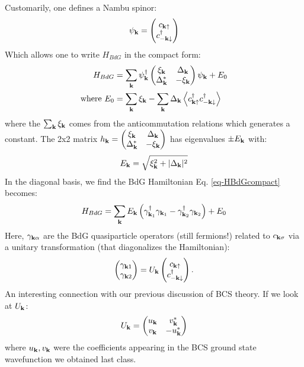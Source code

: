 Customarily, one defines a Nambu spinor:
\begin{equation}
    \psi_{\mathbf{k}} = \begin{pmatrix}c_{\mathbf{k}\uparrow} \\ c^\dagger_{-\mathbf{k}\downarrow}\end{pmatrix}
\end{equation}
Which allows one to write $H_{BdG}$ in the compact form:
\begin{equation}\label{eq-HBdGcompact}
    \begin{split}
        H_{BdG} &= \sum_{\mathbf{k}} \psi_{\mathbf{k}}^\dagger \begin{pmatrix}\xi_{\mathbf{k}} & \Delta_{\mathbf{k}} \\ \Delta_{\mathbf{k}}^* & -\xi_{\mathbf{k}}\end{pmatrix}\psi_{\mathbf{k}} + E_0
        \\ \text{where }  E_0 &= \sum_{\mathbf{k}}\xi_{\mathbf{k}} - \sum_{\mathbf{k}}\Delta_{\mathbf{k}}\left< c^\dagger_{\mathbf{k}\uparrow}c^\dagger_{-\mathbf{k}\downarrow} \right>
    \end{split}
\end{equation}
where the $\sum_{\mathbf{k}}\xi_{\mathbf{k}}$ comes from the anticommutation relations which generates a constant. The 2x2 matrix $h_{\mathbf{k}} = \begin{pmatrix}\xi_{\mathbf{k}} & \Delta_{\mathbf{k}} \\ \Delta_{\mathbf{k}}^* & -\xi_{\mathbf{k}}\end{pmatrix}$ has eigenvalues $\pm E_{\mathbf{k}}$ with:
\begin{equation}
    E_{\mathbf{k}} = \sqrt{\xi_{\mathbf{k}}^2 + \lvert \Delta_{\mathbf{k}} \rvert^2}
\end{equation}
In the diagonal basis, we find the BdG Hamiltonian Eq. \eqref{eq-HBdGcompact} becomes:
\begin{equation}\label{eq-BdGdiagonal}
    H_{BdG} = \sum_{\mathbf{k}}E_{\mathbf{k}}\left(\gamma^\dagger_{\mathbf{k}_1}\gamma_{\mathbf{k}_1} - \gamma^\dagger_{\mathbf{k}_2}\gamma_{\mathbf{k}_2}\right) + E_0
\end{equation}
Here, $\gamma_{\mathbf{k}\alpha}$ are the BdG quasiparticle operators (still fermions!) related to $c_{\mathbf{k}\sigma}$ via a unitary transformation (that diagonalizes the Hamiltonian):
\begin{align*}
    \begin{pmatrix}\gamma_{\mathbf{k}1} \\ \gamma_{\mathbf{k}2}\end{pmatrix} = U_{\mathbf{k}}\begin{pmatrix}c_{\mathbf{k}\uparrow} \\ c^\dagger_{-\mathbf{k}\downarrow}\end{pmatrix}.
\end{align*}
An interesting connection with our previous discussion of BCS theory. If we look at $U_{\mathbf{k}}$:
\begin{align*}
    U_{\mathbf{k}} = \begin{pmatrix}u_{\mathbf{k}} & v_{\mathbf{k}}^* \\ v_{\mathbf{k}} & -u_{\mathbf{k}}^*\end{pmatrix}
\end{align*}
where $u_{\mathbf{k}}, v_{\mathbf{k}}$ were the coefficients appearing in the BCS ground state wavefunction we obtained last class.

